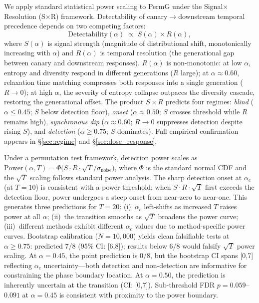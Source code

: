 We apply standard statistical power scaling to PermG under the Signal$\times$Resolution (S$\times$R) framework.
Detectability of canary$\to$downstream temporal precedence depends on two competing factors:
\begin{equation}
    \text{Detectability}(\alpha) \;\propto\; S(\alpha) \times R(\alpha),
    \label{eq:detectability}
\end{equation}
where $S(\alpha)$ is signal strength (magnitude of distributional shift, monotonically increasing with $\alpha$) and $R(\alpha)$ is temporal resolution (the generational gap between canary and downstream responses).
$R(\alpha)$ is non-monotonic: at low $\alpha$, entropy and diversity respond in different generations ($R$ large); at $\alpha{\approx}0.60$, relaxation time matching compresses both responses into a single generation ($R \to 0$); at high $\alpha$, the severity of entropy collapse outpaces the diversity cascade, restoring the generational offset.
The product $S \times R$ predicts four regimes: \emph{blind} ($\alpha \leq 0.45$; $S$ below detection floor), \emph{onset} ($\alpha \approx 0.50$; $S$ crosses threshold while $R$ remains high), \emph{synchronous dip} ($\alpha \approx 0.60$; $R \to 0$ suppresses detection despite rising $S$), and \emph{detection} ($\alpha \geq 0.75$; $S$ dominates).
Full empirical confirmation appears in \S\ref{sec:regime} and \S\ref{sec:dose_response}.

Under a permutation test framework, detection power scales as $\mathrm{Power}(\alpha, T) = \Phi\bigl(S \cdot R \cdot \sqrt{T} / \sigma_{\mathrm{noise}}\bigr)$, where $\Phi$ is the standard normal CDF and the $\sqrt{T}$ scaling follows standard power analysis.
The sharp detection onset at $\alpha_c$ (at $T{=}10$) is consistent with a power threshold: when $S \cdot R \cdot \sqrt{T}$ first exceeds the detection floor, power undergoes a steep onset from near-zero to near-one.
This generates three predictions for $T{=}20$: (i)~$\alpha_c$ left-shifts as increased $T$ raises power at all $\alpha$; (ii)~the transition smooths as $\sqrt{T}$ broadens the power curve; (iii)~different methods exhibit different $\alpha_c$ values due to method-specific power curves.
Bootstrap calibration ($N{=}10{,}000$) yields clean falsifiable tests at $\alpha{\geq}0.75$: predicted 7/8 (95\% CI: [6,8]); results below 6/8 would falsify $\sqrt{T}$ power scaling.
At $\alpha{=}0.45$, the point prediction is 0/8, but the bootstrap CI spans [0,7] reflecting $\alpha_c$ uncertainty---both detection and non-detection are informative for constraining the phase boundary location.
At $\alpha{=}0.50$, the prediction is inherently uncertain at the transition (CI: [0,7]).
Sub-threshold FDR $p{=}0.059$--$0.091$ at $\alpha{=}0.45$ is consistent with proximity to the power boundary.

